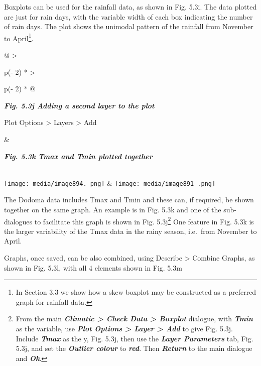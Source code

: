 \documentclass[
  letterpaper,
  DIV=11,
  numbers=noendperiod]{scrreprt}
\begin{document}
Boxplots can be used for the rainfall data, as shown in Fig. 5.3i. The
data plotted are just for rain days, with the variable width of each box
indicating the number of rain days. The plot shows the unimodal pattern
of the rainfall from November to April\footnote{In Section 3.3 we show
  how a skew boxplot may be constructed as a preferred graph for
  rainfall data.}.

\begin{longtable}[]{@{}
  >{\raggedright\arraybackslash}p{(\columnwidth - 2\tabcolsep) * }
  >{\raggedright\arraybackslash}p{(\columnwidth - 2\tabcolsep) * }@{}}
\toprule\noalign{}
\begin{minipage}[b]{\linewidth}\raggedright
\textbf{\emph{Fig. 5.3j Adding a second layer to the plot}}

Plot Options \textgreater{} Layers \textgreater{} Add
\end{minipage} & \begin{minipage}[b]{\linewidth}\raggedright
\textbf{\emph{Fig. 5.3k Tmax and Tmin plotted together}}
\end{minipage} \\
\midrule\noalign{}
\endhead
\bottomrule\noalign{}
\endlastfoot
\texttt{[image: media/image894. png]}
&
\texttt{[image: media/image891 .png]} \\
\end{longtable}

The Dodoma data includes Tmax and Tmin and these can, if required, be
shown together on the same graph. An example is in Fig. 5.3k and one of
the sub-dialogues to facilitate this graph is shown in Fig.
5.3j\footnote{From the main \textbf{\emph{Climatic \textgreater{} Check
  Data \textgreater{} Boxplot}} dialogue, with \textbf{\emph{Tmin}} as
  the variable, use \textbf{\emph{Plot Options \textgreater{} Layer
  \textgreater{} Add}} to give Fig. 5.3j. Include \textbf{\emph{Tmax}}
  as the y, Fig. 5.3j, then use the \textbf{\emph{Layer Parameters}}
  tab, Fig. 5.3j, and set the \textbf{\emph{Outlier colour}} to
  \textbf{\emph{red}}. Then \textbf{\emph{Return}} to the main dialogue
  and \textbf{\emph{Ok}}.} One feature in Fig. 5.3k is the larger
variability of the Tmax data in the rainy season, i.e.~from November to
April.

Graphs, once saved, can be also combined, using Describe \textgreater{}
Combine Graphs, as shown in Fig. 5.3l, with all 4 elements shown in Fig.
5.3m
\end{document}
